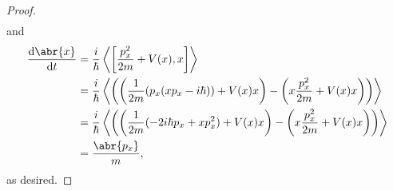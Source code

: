 \documentclass[11pt]{article}
\newcommand{\br}[1]{\left(#1\right)}
\newcommand{\sbr}[1]{\left[#1\right]}
\begin{document}
\begin{enumerate}[label=26.\arabic*]
\begin{enumerate}[label=(\alph*)]
\begin{proof}
\begin{align*}
            \end{align*} and \begin{align*}
                \dv{\abr{x}}{t} &= \frac{i}{\hbar}\left\langle\sbr{\frac{p_x^2}{2m}+ V(x),x}\right\rangle\\
                &= \frac{i}{\hbar}\left\langle\br{\br{\frac{1}{2m}(p_x(xp_x -i\hbar)) + V(x)x}- \br{x\frac{p_x^2}{2m}+ V(x)x} }\right\rangle\\
                &= \frac{i}{\hbar}\left\langle\br{\br{\frac{1}{2m}( -2i\hbar p_x + xp_x^2 ) + V(x)x}- \br{x\frac{p_x^2}{2m}+ V(x)x} }\right\rangle\\
                &= \frac{\abr{p_x}}{m},
            \end{align*} as desired.
        \end{proof}
    \end{enumerate}
\end{enumerate}
\end{document}
